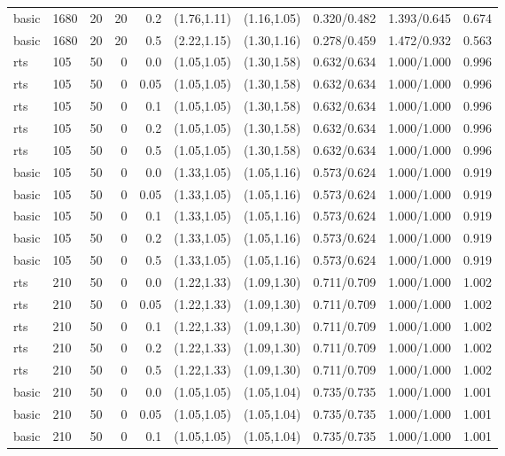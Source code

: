 \begin{tabular}{llrrrccccc}
basic & 1680 & 20 & 20 & 0.2 & (1.76,1.11) & (1.16,1.05) & 0.320/0.482 & 1.393/0.645 & 0.674 \\
basic & 1680 & 20 & 20 & 0.5 & (2.22,1.15) & (1.30,1.16) & 0.278/0.459 & 1.472/0.932 & 0.563 \\
rts & 105 & 50 & 0 & 0.0 & (1.05,1.05) & (1.30,1.58) & 0.632/0.634 & 1.000/1.000 & 0.996 \\
rts & 105 & 50 & 0 & 0.05 & (1.05,1.05) & (1.30,1.58) & 0.632/0.634 & 1.000/1.000 & 0.996 \\
rts & 105 & 50 & 0 & 0.1 & (1.05,1.05) & (1.30,1.58) & 0.632/0.634 & 1.000/1.000 & 0.996 \\
rts & 105 & 50 & 0 & 0.2 & (1.05,1.05) & (1.30,1.58) & 0.632/0.634 & 1.000/1.000 & 0.996 \\
rts & 105 & 50 & 0 & 0.5 & (1.05,1.05) & (1.30,1.58) & 0.632/0.634 & 1.000/1.000 & 0.996 \\
basic & 105 & 50 & 0 & 0.0 & (1.33,1.05) & (1.05,1.16) & 0.573/0.624 & 1.000/1.000 & 0.919 \\
basic & 105 & 50 & 0 & 0.05 & (1.33,1.05) & (1.05,1.16) & 0.573/0.624 & 1.000/1.000 & 0.919 \\
basic & 105 & 50 & 0 & 0.1 & (1.33,1.05) & (1.05,1.16) & 0.573/0.624 & 1.000/1.000 & 0.919 \\
basic & 105 & 50 & 0 & 0.2 & (1.33,1.05) & (1.05,1.16) & 0.573/0.624 & 1.000/1.000 & 0.919 \\
basic & 105 & 50 & 0 & 0.5 & (1.33,1.05) & (1.05,1.16) & 0.573/0.624 & 1.000/1.000 & 0.919 \\
rts & 210 & 50 & 0 & 0.0 & (1.22,1.33) & (1.09,1.30) & 0.711/0.709 & 1.000/1.000 & 1.002 \\
rts & 210 & 50 & 0 & 0.05 & (1.22,1.33) & (1.09,1.30) & 0.711/0.709 & 1.000/1.000 & 1.002 \\
rts & 210 & 50 & 0 & 0.1 & (1.22,1.33) & (1.09,1.30) & 0.711/0.709 & 1.000/1.000 & 1.002 \\
rts & 210 & 50 & 0 & 0.2 & (1.22,1.33) & (1.09,1.30) & 0.711/0.709 & 1.000/1.000 & 1.002 \\
rts & 210 & 50 & 0 & 0.5 & (1.22,1.33) & (1.09,1.30) & 0.711/0.709 & 1.000/1.000 & 1.002 \\
basic & 210 & 50 & 0 & 0.0 & (1.05,1.05) & (1.05,1.04) & 0.735/0.735 & 1.000/1.000 & 1.001 \\
basic & 210 & 50 & 0 & 0.05 & (1.05,1.05) & (1.05,1.04) & 0.735/0.735 & 1.000/1.000 & 1.001 \\
basic & 210 & 50 & 0 & 0.1 & (1.05,1.05) & (1.05,1.04) & 0.735/0.735 & 1.000/1.000 & 1.001 \\

\end{tabular}
